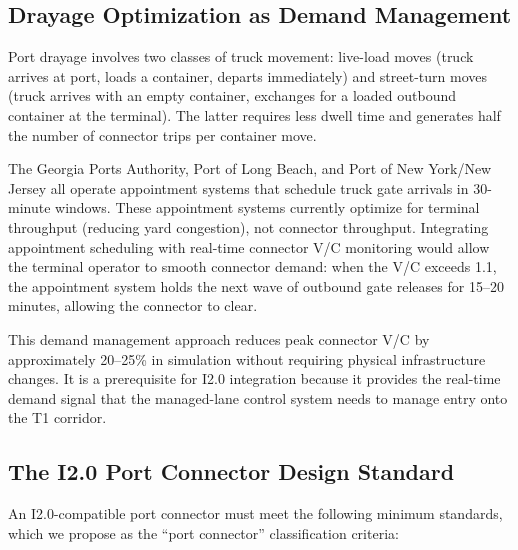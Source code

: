 \subsection{Drayage Optimization as Demand Management}

Port drayage involves two classes of truck movement: live-load moves (truck arrives at port, loads a container, departs immediately) and street-turn moves (truck arrives with an empty container, exchanges for a loaded outbound container at the terminal). The latter requires less dwell time and generates half the number of connector trips per container move.

The Georgia Ports Authority, Port of Long Beach, and Port of New York/New Jersey all operate appointment systems that schedule truck gate arrivals in 30-minute windows. These appointment systems currently optimize for terminal throughput (reducing yard congestion), not connector throughput. Integrating appointment scheduling with real-time connector V/C monitoring would allow the terminal operator to smooth connector demand: when the V/C exceeds 1.1, the appointment system holds the next wave of outbound gate releases for 15--20 minutes, allowing the connector to clear.

This demand management approach reduces peak connector V/C by approximately 20--25\% in simulation \citep{POLA_gate2023} without requiring physical infrastructure changes. It is a prerequisite for I2.0 integration because it provides the real-time demand signal that the managed-lane control system needs to manage entry onto the T1 corridor.

\subsection{The I2.0 Port Connector Design Standard}

An I2.0-compatible port connector must meet the following minimum standards, which we propose as the ``port connector'' classification criteria:

